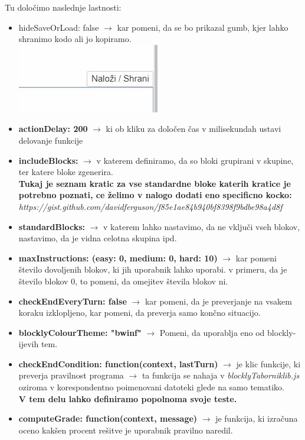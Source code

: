 \documentclass[11pt]{article} %
\begin{document}
Tu določimo naslednje lastnosti:
\begin{itemize}
\item hideSaveOrLoad: false $\rightarrow$ kar pomeni, da se bo prikazal gumb, kjer lahko shranimo kodo ali jo kopiramo. \\
\includegraphics[scale=0.6]{nalozi,shrani}\\
\item \textbf{actionDelay: 200} $\rightarrow$ ki ob kliku za določen čas v milisekundah ustavi delovanje funkcije
\item \textbf{includeBlocks:}  $\rightarrow$ v katerem definiramo, da so bloki grupirani v skupine, ter katere bloke zgenerira.\\
\textbf{Tukaj je seznam kratic za vse standardne bloke katerih kratice je potrebno poznati, 
  ce želimo v nalogo dodati eno specificno kocko:}\\
		
		 \textit{https://gist.github.com/davidferguson/f85e1ae84b940bf8398f9bdbe98a4d8f}\\[0.5cm]

\item \textbf{standardBlocks:}  $\rightarrow$ v katerem lahko nastavimo, da ne vključi vseh blokov, nastavimo, da je vidna celotna skupina ipd.
\item \textbf{maxInstructions: (easy: 0, medium: 0, hard: 10)} $\rightarrow$ kar pomeni število dovoljenih blokov, ki jih uporabnik lahko uporabi. v primeru, da je število blokov 0, to pomeni, da omejitev števila blokov ni.
\item \textbf{checkEndEveryTurn: false} $\rightarrow$ kar pomeni, da je preverjanje na vsakem koraku izklopljeno, kar pomeni, da preverja samo končno situacijo.
\item \textbf{blocklyColourTheme: "bwinf"} $\rightarrow$ Pomeni, da uporablja eno od blockly-ijevih tem.
\item \textbf{checkEndCondition: function(context, lastTurn)} $\rightarrow$ je klic funkcije, ki preverja pravilnost programa $\rightarrow$ ta funkcija se nahaja v \textit{blocklyTabornik\textunderscore lib.js} oziroma v korespondentno poimenovani datoteki glede na samo tematiko. \\
\textbf{V tem delu lahko definiramo popolnoma svoje teste.}
\item \textbf{computeGrade: function(context, message)} $\rightarrow$ je funkcija, ki izračuna oceno kakšen procent rešitve je uporabnik pravilno naredil.
\end{itemize}
\end{document}
